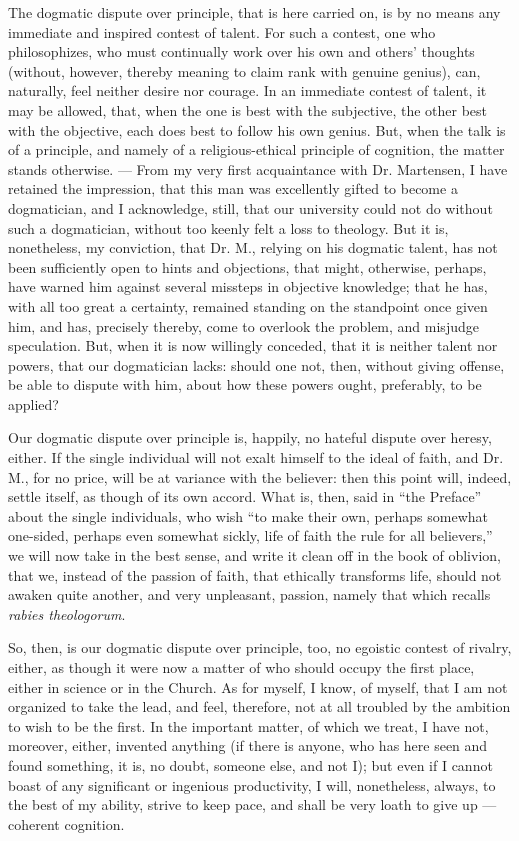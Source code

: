 \documentclass[12pt]{book}
\begin{document}
The dogmatic dispute over principle, that is here carried on, is by no means any immediate and inspired contest of talent. For such a contest, one who philosophizes, who must continually work over his own and others' thoughts (without, however, thereby meaning to claim rank with genuine genius), can, naturally, feel neither desire nor courage. In an immediate contest of talent, it may be allowed, that, when the one is best with the subjective, the other best with the objective, each does best to follow his own genius. But, when the talk is of a principle, and namely of a religious-ethical principle of cognition, the matter stands otherwise. --- From my very first acquaintance with Dr. Martensen, I have retained the impression, that this man was excellently gifted to become a dogmatician, and I acknowledge, still, that our university could not
do without such a dogmatician, without too keenly felt a loss to theology. But it is, nonetheless, my conviction, that Dr. M., relying on his dogmatic talent, has not been sufficiently open to hints and objections, that might, otherwise, perhaps, have warned him against several missteps in objective knowledge; that he has, with all too great a certainty, remained standing on the standpoint once given him, and has, precisely thereby, come to overlook the problem, and misjudge speculation. But, when it is now willingly conceded, that it is neither talent nor powers, that our dogmatician lacks: should one not, then, without giving offense, be able to dispute with him, about how these powers ought, preferably, to be applied?

Our dogmatic dispute over principle is, happily, no hateful dispute over heresy, either. If the single individual will not exalt himself to the ideal of faith, and Dr. M., for no price, will be at variance with the believer: then this point will, indeed, settle itself, as though of its own accord. What is, then, said in ``the Preface'' about the single individuals, who wish ``to make their own, perhaps somewhat one-sided, perhaps even somewhat sickly, life of faith the rule for all believers,'' we will now take in the best sense, and write it clean off in the book of oblivion, that we, instead of the passion of faith, that ethically transforms life, should not awaken quite another, and very unpleasant, passion, namely that which recalls \textit{rabies theologorum}.

So, then, is our dogmatic dispute over principle, too, no egoistic contest of rivalry, either, as though it were now a matter
of who should occupy the first place, either in science or in the Church. As for myself, I know, of myself, that I am not organized to take the lead, and feel, therefore, not at all troubled by the ambition to wish to be the first. In the important matter, of which we treat, I have not, moreover, either, invented anything (if there is anyone, who has here seen and found something, it is, no doubt, someone else, and not I); but even if I cannot boast of any significant or ingenious productivity, I will, nonetheless, always, to the best of my ability, strive to keep pace, and shall be very loath to give up --- coherent cognition.
\end{document}
